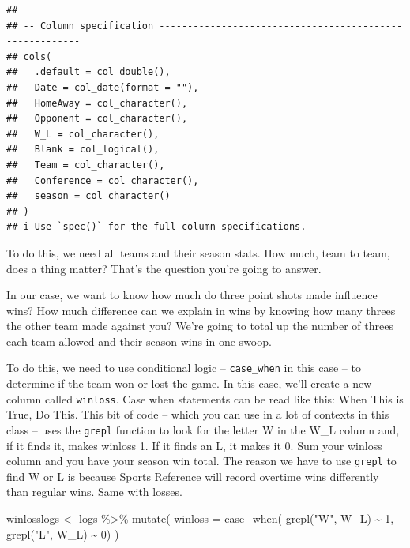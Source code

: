 \documentclass[
]{book}
\newenvironment{Shaded}{\begin{snugshade}}{\end{snugshade}}
\newcommand{\AttributeTok}[1]{\textcolor[rgb]{0.77,0.63,0.00}{#1}}
\newcommand{\DecValTok}[1]{\textcolor[rgb]{0.00,0.00,0.81}{#1}}
\newcommand{\FunctionTok}[1]{\textcolor[rgb]{0.00,0.00,0.00}{#1}}
\newcommand{\NormalTok}[1]{#1}
\newcommand{\OtherTok}[1]{\textcolor[rgb]{0.56,0.35,0.01}{#1}}
\newcommand{\SpecialCharTok}[1]{\textcolor[rgb]{0.00,0.00,0.00}{#1}}
\newcommand{\StringTok}[1]{\textcolor[rgb]{0.31,0.60,0.02}{#1}}
\begin{document}
\begin{verbatim}
## 
## -- Column specification --------------------------------------------------------
## cols(
##   .default = col_double(),
##   Date = col_date(format = ""),
##   HomeAway = col_character(),
##   Opponent = col_character(),
##   W_L = col_character(),
##   Blank = col_logical(),
##   Team = col_character(),
##   Conference = col_character(),
##   season = col_character()
## )
## i Use `spec()` for the full column specifications.
\end{verbatim}

To do this, we need all teams and their season stats. How much, team to team, does a thing matter? That's the question you're going to answer.

In our case, we want to know how much do three point shots made influence wins? How much difference can we explain in wins by knowing how many threes the other team made against you? We're going to total up the number of threes each team allowed and their season wins in one swoop.

To do this, we need to use conditional logic -- \texttt{case\_when} in this case -- to determine if the team won or lost the game. In this case, we'll create a new column called \texttt{winloss}. Case when statements can be read like this: When This is True, Do This. This bit of code -- which you can use in a lot of contexts in this class -- uses the \texttt{grepl} function to look for the letter W in the W\_L column and, if it finds it, makes winloss 1. If it finds an L, it makes it 0. Sum your winloss column and you have your season win total. The reason we have to use \texttt{grepl} to find W or L is because Sports Reference will record overtime wins differently than regular wins. Same with losses.

\begin{Shaded}
\begin{Highlighting}[]
\NormalTok{winlosslogs }\OtherTok{\textless{}{-}}\NormalTok{ logs }\SpecialCharTok{\%\textgreater{}\%} 
  \FunctionTok{mutate}\NormalTok{(}
    \AttributeTok{winloss =} \FunctionTok{case\_when}\NormalTok{(}
      \FunctionTok{grepl}\NormalTok{(}\StringTok{"W"}\NormalTok{, W\_L) }\SpecialCharTok{\textasciitilde{}} \DecValTok{1}\NormalTok{, }
      \FunctionTok{grepl}\NormalTok{(}\StringTok{"L"}\NormalTok{, W\_L) }\SpecialCharTok{\textasciitilde{}} \DecValTok{0}\NormalTok{)}
\NormalTok{)}
\end{Highlighting}
\end{Shaded}
\end{document}
